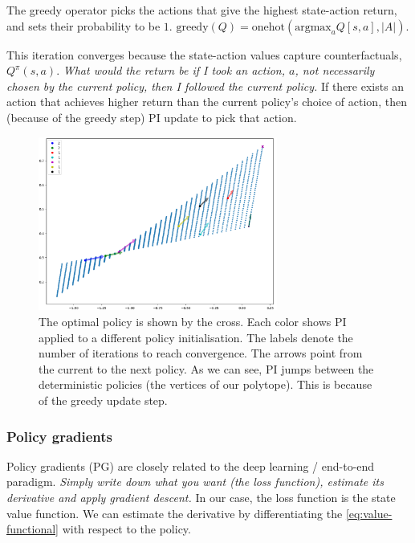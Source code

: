 The greedy operator picks the actions that give the highest state-action return,
and sets their probability to be $1$.
$\text{greedy}(Q) = \text{onehot}(\text{argmax}_a Q[s, a], |A|)$.

This iteration converges because the state-action values capture counterfactuals, $Q^{\pi}(s, a)$.
\textit{What would the return be if I took an action, $a$, not necessarily chosen by
the current policy, then I followed the current policy.}
If there exists an action that achieves higher return than the current policy's choice of action,
then (because of the greedy step) PI update to pick that action.

\begin{figure}[h!]
\centering
\includegraphics[width=0.7\textwidth,height=0.35\textheight]{../../pictures/figures/pi-polytope.png}
\caption{The optimal policy is shown by the cross.
Each color shows PI applied to a different policy initialisation.
The labels denote the number of iterations to reach convergence.
The arrows point from the current to the next policy. As we can see,
PI jumps between the deterministic policies (the vertices of our polytope).
This is because of the greedy update step.}
\end{figure}

\newpage
\subsubsection{Policy gradients}

Policy gradients (PG) are closely related to the deep learning / end-to-end paradigm.
\textit{Simply write down what you want (the loss function),
estimate its derivative and apply gradient descent.} In our case, the loss function
is the state value function. We can estimate the derivative
by differentiating the \ref{eq:value-functional} with respect to the policy.

